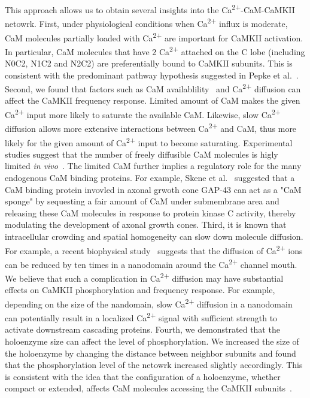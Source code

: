\documentclass[10pt,letterpaper]{article}
\begin{document}
This approach allows us to obtain several insights into the Ca\textsuperscript{2+}-CaM-CaMKII netowrk. First, under physiological conditions when Ca\textsuperscript{2+} influx is moderate, CaM molecules partially loaded with Ca\textsuperscript{2+} are important for CaMKII activation. In particular, CaM molecules that have 2 Ca\textsuperscript{2+} attached on the C lobe (including N0C2, N1C2 and N2C2) are preferentially bound to CaMKII subunits. This is consistent with the predominant pathway hypothesis suggested in Pepke et al.~\cite{Pepke:2010ju}. Second, we found that factors such as CaM availablility~\cite{DeKoninck:1998wh} and Ca\textsuperscript{2+} diffusion can affect the CaMKII frequency response. Limited amount of CaM makes the given Ca\textsuperscript{2+} input more likely to saturate the available CaM. Likewise, slow Ca\textsuperscript{2+} diffusion allows more extensive interactions between Ca\textsuperscript{2+} and CaM, thus more likely for the given amount of Ca\textsuperscript{2+} input to become saturating. Experimental studies suggest that the number of freely diffusible CaM molecules is higly limited \textit{in vivo}~\cite{2008BpJ....95.6002S,Persechini:2002tb,LubyPhelps:1995kl}. The limited CaM further implies a regulatory role for the many endogenous CaM binding proteins. For example, Skene et al.~\cite{Skene:1990kf} suggested that a CaM binding protein invovled in axonal grwoth cone GAP-43 can act as a "CaM sponge" by sequesting a fair amount of CaM under submembrane area and releasing these CaM molecules in response to protein kinase C activity, thereby modulating the development of axonal growth cones. Third, it is known that intracellular crowding and spatial homogeneity can slow down molecule diffusion. For example, a recent biophysical study~\cite{2013PNAS..11015794T} suggests that the diffusion of Ca\textsuperscript{2+} ions can be reduced by ten times in a nanodomain around the Ca\textsuperscript{2+} channel mouth. We believe that such a complication in Ca\textsuperscript{2+} diffusion may have substantial effects on CaMKII phosphorylation and frequency response. For example, depending on the size of the nandomain, slow Ca\textsuperscript{2+} diffusion in a nanodomain can potentially result in a localized Ca\textsuperscript{2+} signal with sufficient strength to activate downstream cascading proteins. Fourth, we demonstrated that the holoenzyme size can affect the level of phosphorylation. We increased the size of the holoenzyme by changing the distance between neighbor subunits and found that the phosphorylation level of the netowrk increased slightly accordingly. This is consistent with the idea that the configuration of a holoenzyme, whether compact or extended, affects CaM molecules accessing the CaMKII subunits~\cite{Stratton:2013el}.
\end{document}
